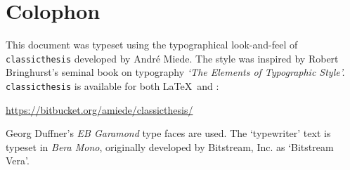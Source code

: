 \pagestyle{empty}

\hfill

\vfill


\section*{Colophon}
This document was typeset using the typographical look-and-feel of \texttt{classicthesis} developed by Andr\'e Miede. 
The style was inspired by Robert Bringhurst's seminal book on typography \emph{`The Elements of Typographic Style'.} 
\texttt{classicthesis} is available for both \LaTeX\ and \mLyX: 
\begin{center}
\url{https://bitbucket.org/amiede/classicthesis/}
\end{center}
 
\bigskip


Georg Duffner's \emph{EB Garamond} type faces are used.
The `typewriter' text is typeset in \emph{Bera Mono}, 
originally developed by Bitstream, Inc. as `Bitstream Vera'.

%
%




